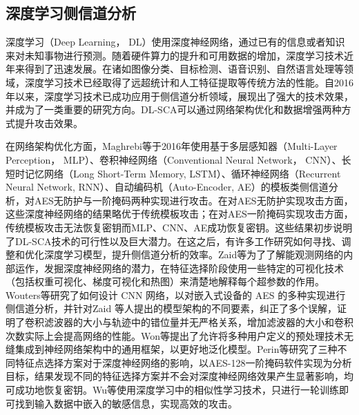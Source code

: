 {	\subsection{深度学习侧信道分析}
	
	深度学习（Deep Learning， DL）使用深度神经网络，通过已有的信息或者知识来对未知事物进行预测。随着硬件算力的提升和可用数据的增加，深度学习技术近年来得到了迅速发展。在诸如图像分类\citep{Szegedy17}、目标检测\citep{Girshick15}、语音识别\citep{Hinton12}、自然语言处理\citep{Radford18}等领域，深度学习技术已经取得了远超统计和人工特征提取等传统方法的性能。自2016年以来，深度学习技术已成功应用于侧信道分析领域，展现出了强大的技术效果，并成为了一类重要的研究方向。DL-SCA可以通过网络架构优化和数据增强两种方式提升攻击效果。
	
	在网络架构优化方面，Maghrebi等\citep{Maghrebi16}于2016年使用基于多层感知器（Multi-Layer Perception， MLP）、卷积神经网络（Conventional Neural Network， CNN）、长短时记忆网络（Long Short-Term Memory, LSTM）、循环神经网络（Recurrent Neural Network, RNN）、自动编码机（Auto-Encoder, AE）的模板类侧信道分析，对AES无防护与一阶掩码两种实现进行攻击。在对AES无防护实现攻击方面，这些深度神经网络的结果略优于传统模板攻击；在对AES一阶掩码实现攻击方面，传统模板攻击无法恢复密钥而MLP、CNN、AE成功恢复密钥。这些结果初步说明了DL-SCA技术的可行性以及巨大潜力。在这之后，有许多工作研究如何寻找、调整和优化深度学习模型，提升侧信道分析的效率。Zaid等\citep{Zaid20}为了了解能观测网络的内部运作，发掘深度神经网络的潜力，在特征选择阶段使用一些特定的可视化技术（包括权重可视化、梯度可视化和热图）来清楚地解释每个超参数的作用。Wouters等\citep{Wouters20}研究了如何设计 CNN 网络，以对嵌入式设备的 AES 的多种实现进行侧信道分析，并针对Zaid 等人提出的模型架构的不同要素，纠正了多个误解，证明了卷积滤波器的大小与轨迹中的错位量并无严格关系，增加滤波器的大小和卷积次数实际上会提高网络的性能。Won等\citep{Won21}提出了允许将多种用户定义的预处理技术无缝集成到神经网络架构中的通用框架，以更好地泛化模型。Perin等\citep{Perin22}研究了三种不同特征点选择方案对于深度神经网络的影响，以AES-128一阶掩码软件实现为分析目标，结果发现不同的特征选择方案并不会对深度神经网络效果产生显著影响，均可成功地恢复密钥。Wu等\citep{Wu22}使用深度学习中的相似性学习技术，只进行一轮训练即可找到输入数据中嵌入的敏感信息，实现高效的攻击。
	
}
